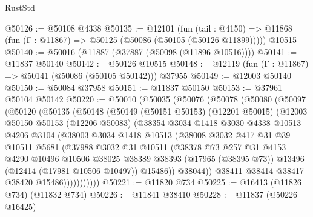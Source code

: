 \begin{lexlean}{RustStd}
\begin{coremodule}
{\begin{coremodule}
{{{{{{{{{{{{{{{{{{{{{{{{{{{{{{{{{{{{{{{{{{{{{{{{{{@50126 := @50108 @4338
@50135 := @12101
    (fun (tail : @4150) => @11868 (fun (Γ : @11867) => @50125 (@50086 (@50105 (@50126 @11899)))))
    @10515
@50140 := @50016 (@11887 (@37887 (@50098 (@11896 @10516))))
@50141 := @11837 @50140
@50142 := @50126 @10515
@50148 := @12119 (fun (Γ : @11867) => @50141 (@50086 (@50105 @50142))) @37955
@50149 := @12003 @50140
@50150 := @50084 @37958
@50151 := @11837 @50150
@50153 := @37961 @50104 @50142
@50220 := @50010
    (@50035
      (@50076
        (@50078
          (@50080
            (@50097
              (@50120
                (@50135
                  (@50148
                    (@50149
                      (@50151 @50153)
                      (@12201 @50015)
                      (@12003
                        @50150
                        @50153
                        (@12206 @50083)
                        (@38354
                          @3034
                          @1418
                          @3030
                          @4338
                          @10513
                          @4206
                          @3104
                          (@38003
                            @3034
                            @1418
                            @10513
                            (@38008
                              @3032
                              @417
                              @31
                              @39
                              @10511
                              @5681
                              (@37988
                                @3032
                                @31
                                @10511
                                (@38378
                                  @73
                                  @257
                                  @31
                                  @4153
                                  @4290
                                  @10496
                                  @10506
                                  @38025
                                  @38389
                                  @38393
                                  (@17965 (@38395 @73))
                                  @13496
                                  (@12414 (@17981 @10506 @10497))
                                  @15486))
                              @38044))
                          @38411
                          @38414
                          @38417
                          @38420
                          @15486)))))))))))
@50221 := @11820 @734
@50225 := @16413 (@11826 @734) (@11832 @734)
@50226 := @11841 @38410
@50228 := @11837 (@50226 @16425)
}}}}}}}}}}}}}}}}}}}}}}}}}}}}}}}}}}}}}}}}}}}}}}}}}}
\end{coremodule}}
\end{coremodule}
\end{lexlean}
